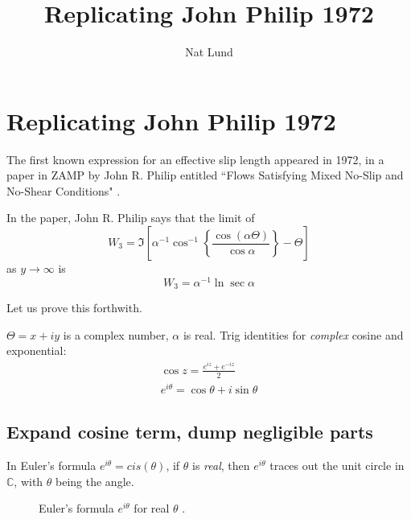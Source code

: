 \documentclass[12pt, a4paper, twoside, openright]{book}
\title{Replicating John Philip 1972}
\author{Nat Lund}
\begin{document}
\chapter{Replicating John Philip 1972}\label{C:jrphilip}

The first known expression for an effective slip length appeared in 1972, in a paper in ZAMP by John R. Philip entitled ``Flows Satisfying Mixed No-Slip and No-Shear Conditions" \cite{Philip1972}.

In the paper, John R. Philip says that the limit of
\begin{equation}
W_{3} = \Im \left[  
 \alpha^{-1} \cos^{-1} 
 \left\{ \frac{\cos(\alpha \Theta)}{\cos \alpha} \right\} - \Theta
   \right]
\end{equation}
as $y\rightarrow \infty$ is
\begin{equation}
W_{3} = \alpha^{-1} \ln \sec \alpha
\end{equation}

Let us prove this forthwith.
\vspace*{1em}

$\Theta = x + iy$ is a complex number, $\alpha$ is real.  Trig identities for \emph{complex} cosine and exponential:
\begin{gather}
\cos z = \frac{e^{iz}+e^{-iz}}{2} \\
e^{i \theta} = \cos \theta + i \sin \theta 
\end{gather}

\clearpage
\section{Expand cosine term, dump negligible parts}

In Euler's formula $e^{i\theta} = cis(\theta)$, if $\theta$ is \emph{real}, then $e^{i \theta}$ traces out the unit circle in $\mathbb{C}$, with $\theta$ being the angle.

\begin{figure}[h]
\centering
{}
\caption{Euler's formula $e^{i \theta}$ for real $\theta$ .}
\end{figure}
\end{document}
